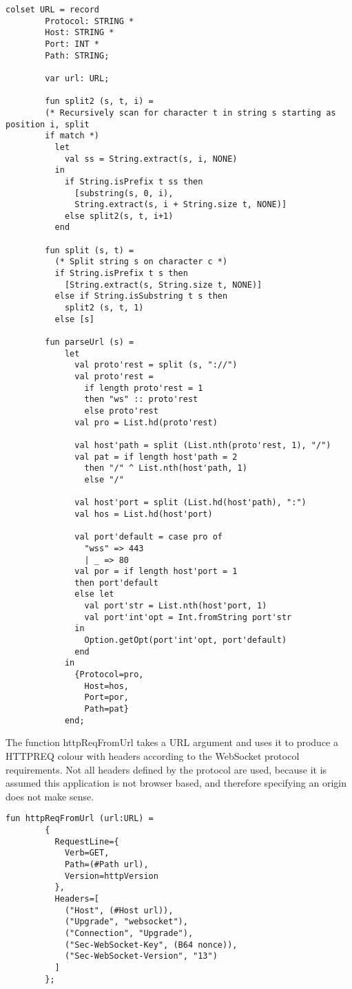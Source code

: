 		\begin{lstlisting}[label=lst:url,caption=URL Declarations,gobble=2]
		colset URL = record
		Protocol: STRING *
		Host: STRING *
		Port: INT *
		Path: STRING;
		
		var url: URL;
		
		fun split2 (s, t, i) =
		(* Recursively scan for character t in string s starting as position i, split
		if match *)
		  let
		    val ss = String.extract(s, i, NONE) 
		  in 
		    if String.isPrefix t ss then
		      [substring(s, 0, i), 
		      String.extract(s, i + String.size t, NONE)]
		    else split2(s, t, i+1)
		  end
		
		fun split (s, t) = 
		  (* Split string s on character c *)
		  if String.isPrefix t s then
		    [String.extract(s, String.size t, NONE)]
		  else if String.isSubstring t s then
		    split2 (s, t, 1)
		  else [s]
		
		fun parseUrl (s) = 
			let
			  val proto'rest = split (s, "://")
			  val proto'rest = 
			    if length proto'rest = 1 
			    then "ws" :: proto'rest 
			    else proto'rest 
			  val pro = List.hd(proto'rest)
			
			  val host'path = split (List.nth(proto'rest, 1), "/")
			  val pat = if length host'path = 2
			    then "/" ^ List.nth(host'path, 1)
			    else "/"
			  
			  val host'port = split (List.hd(host'path), ":")
			  val hos = List.hd(host'port)
			
			  val port'default = case pro of
			    "wss" => 443
			    | _ => 80
			  val por = if length host'port = 1 
			  then port'default
			  else let
			    val port'str = List.nth(host'port, 1)
			    val port'int'opt = Int.fromString port'str
			  in
			    Option.getOpt(port'int'opt, port'default)
			  end
			in
			  {Protocol=pro, 
			    Host=hos, 
			    Port=por, 
			    Path=pat}
			end;
		\end{lstlisting}
		
		The function httpReqFromUrl takes a URL argument and uses it to produce a
		HTTPREQ colour with headers according to the WebSocket protocol requirements.
		Not all headers defined by the protocol are used, because it is assumed this
		application is not browser based, and therefore specifying an origin does not
		make sense. 
		
		\begin{lstlisting}[label=lst:httpReqFromUrl,caption=httpReqFromUrl,gobble=2]
		fun httpReqFromUrl (url:URL) = 
		{
		  RequestLine={
		    Verb=GET, 
		    Path=(#Path url),
		    Version=httpVersion
		  },
		  Headers=[
		    ("Host", (#Host url)),
		    ("Upgrade", "websocket"),
		    ("Connection", "Upgrade"),
		    ("Sec-WebSocket-Key", (B64 nonce)),
		    ("Sec-WebSocket-Version", "13")
		  ]
		};
		\end{lstlisting}
		
